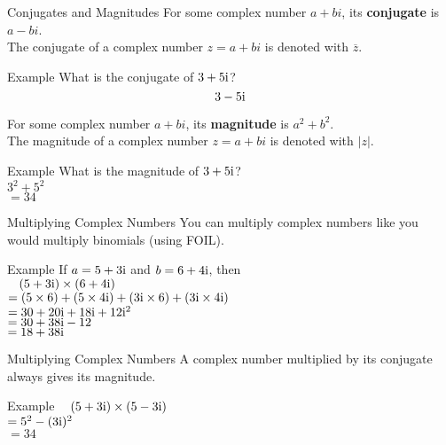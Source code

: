 \begin{namedframe}{Conjugates and Magnitudes}
	For some complex number $a + bi$, its \textbf{conjugate} is $a - bi$. \\
	The conjugate of a complex number $z = a + bi$ is denoted with $\overline{z}$.
	\begin{exampleblock}{Example}
		What is the conjugate of $3 + 5\mathrm{i}$?
		\pause
		\[3 - 5\mathrm{i}\]
	\end{exampleblock}

	\pause

	For some complex number $a + bi$, its \textbf{magnitude} is $a^2 + b^2$. \\
	The magnitude of a complex number $z = a + bi$ is denoted with $|z|$.
	\begin{exampleblock}{Example}
		What is the magnitude of $3 + 5\mathrm{i}$? \\
		\pause
		\phantom{X}$3^2 + 5^2$ \\
		$ = 34$
	\end{exampleblock}
\end{namedframe}

\begin{namedframe}{Multiplying Complex Numbers}
	You can multiply complex numbers like you would multiply binomials (using FOIL).
	\begin{exampleblock}{Example}
		If $a = 5 + 3\mathrm{i}$ and $b = 6 + 4\mathrm{i}$, then \\
		$\phantom{X}(5 + 3\mathrm{i})\times(6 + 4\mathrm{i})$ \\
		$= (5\times6) + (5\times4\mathrm{i}) + (3\mathrm{i}\times6) + (3\mathrm{i}\times4\mathrm{i})$ \\
		$= 30 + 20\mathrm{i} + 18\mathrm{i} + 12\mathrm{i}^2$ \\
		$= 30 + 38\mathrm{i} - 12$ \\
		$= 18 + 38\mathrm{i}$ \\
	\end{exampleblock}
\end{namedframe}

\begin{namedframe}{Multiplying Complex Numbers}
	A complex number multiplied by its conjugate always gives its magnitude.
	\begin{exampleblock}{Example}
		$\phantom{X}(5 + 3\mathrm{i})\times(5 - 3\mathrm{i})$ \\
		$= 5^2 - (3\mathrm{i})^2$ \\
		$= 34$
	\end{exampleblock}
\end{namedframe}

